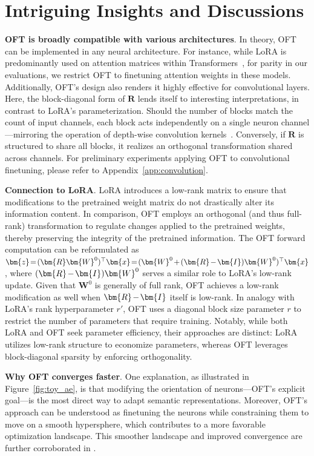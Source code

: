 \section{Intriguing Insights and Discussions}

\textbf{OFT is broadly compatible with various architectures}. In theory, OFT can be implemented in any neural architecture. For instance, while LoRA is predominantly used on attention matrices within Transformers~\cite{hulora2022}, for parity in our evaluations, we restrict OFT to finetuning attention weights in these models. Additionally, OFT’s design also renders it highly effective for convolutional layers. Here, the block-diagonal form of $\bm{R}$ lends itself to interesting interpretations, in contrast to LoRA’s parameterization. Should the number of blocks match the count of input channels, each block acts independently on a single neuron channel—mirroring the operation of depth-wise convolution kernels~\cite{chollet2017xception}. Conversely, if $\bm{R}$ is structured to share all blocks, it realizes an orthogonal transformation shared across channels. For preliminary experiments applying OFT to convolutional finetuning, please refer to Appendix~\ref{app:convolution}.

\textbf{Connection to LoRA}. LoRA introduces a low-rank matrix to ensure that modifications to the pretrained weight matrix do not drastically alter its information content. In comparison, OFT employs an orthogonal (and thus full-rank) transformation to regulate changes applied to the pretrained weights, thereby preserving the integrity of the pretrained information. The OFT forward computation can be reformulated as $\thickmuskip=2mu \medmuskip=2mu \bm{z}=(\bm{R}\bm{W}^0)^\top\bm{x}=(\bm{W}^0+(\bm{R}-\bm{I})\bm{W}^0)^\top\bm{x}$, where $\thickmuskip=2mu \medmuskip=2mu (\bm{R}-\bm{I})\bm{W}^0$ serves a similar role to LoRA’s low-rank update. Given that $\bm{W}^0$ is generally of full rank, OFT achieves a low-rank modification as well when $\thickmuskip=2mu \medmuskip=2mu \bm{R}-\bm{I}$ itself is low-rank. In analogy with LoRA’s rank hyperparameter $r'$, OFT uses a diagonal block size parameter $r$ to restrict the number of parameters that require training. Notably, while both LoRA and OFT seek parameter efficiency, their approaches are distinct: LoRA utilizes low-rank structure to economize parameters, whereas OFT leverages block-diagonal sparsity by enforcing orthogonality.

\textbf{Why OFT converges faster}. One explanation, as illustrated in Figure~\ref{fig:toy_ae}, is that modifying the orientation of neurons—OFT’s explicit goal—is the most direct way to adapt semantic representations. Moreover, OFT’s approach can be understood as finetuning the neurons while constraining them to move on a smooth hypersphere, which contributes to a more favorable optimization landscape. This smoother landscape and improved convergence are further corroborated in \cite{liu2021orthogonal}.


